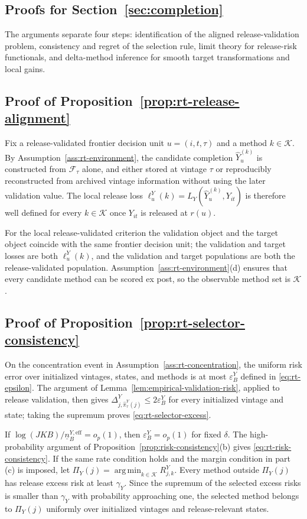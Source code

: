 \documentclass[a4paper, 12pt]{article}
\theoremstyle{plain}
\theoremstyle{remark}
\DeclareMathOperator*{\argmin}{arg\,min}
\newcommand{\Kcal}{\mathcal{K}}
\newcommand{\Fcal}{\mathcal{F}}
\newcommand{\1}{\mathbf{1}}
\begin{document}
\subsection{Proofs for Section~\ref{sec:completion}}

The arguments separate four steps: identification of the aligned release-validation problem, consistency and regret of the selection rule, limit theory for release-risk functionals, and delta-method inference for smooth target transformations and local gains.

\subsection*{Proof of Proposition~\ref{prop:rt-release-alignment}}
Fix a release-validated frontier decision unit \(u=(i,t,\tau)\) and a method \(k\in\Kcal\). By Assumption~\ref{ass:rt-environment}, the candidate completion \(\widehat Y^{(k)}_u\) is constructed from \(\Fcal_\tau\) alone, and either stored at vintage \(\tau\) or reproducibly reconstructed from archived vintage information without using the later validation value. The local release loss \(\ell^Y_u(k)=L_Y(\widehat Y^{(k)}_u,Y_{it})\) is therefore well defined for every \(k\in\Kcal\) once \(Y_{it}\) is released at \(r(u)\).

For the local release-validated criterion the validation object and the target object coincide with the same frontier decision unit; the validation and target losses are both \(\ell^Y_u(k)\), and the validation and target populations are both the release-validated population. Assumption~\ref{ass:rt-environment}(d) ensures that every candidate method can be scored ex post, so the observable method set is \(\Kcal\).

\subsection*{Proof of Proposition~\ref{prop:rt-selector-consistency}}
On the concentration event in Assumption~\ref{ass:rt-concentration}, the uniform risk error over initialized vintages, states, and methods is at most \(\varepsilon^Y_B\) defined in \eqref{eq:rt-epsilon}. The argument of Lemma~\ref{lem:empirical-validation-risk}, applied to release validation, then gives \(\Delta^Y_{j,\widehat\pi^Y_\tau(j)}\leq 2\varepsilon^Y_B\) for every initialized vintage and state; taking the supremum proves \eqref{eq:rt-selector-excess}.

If \(\log(JKB)/\underline n^{Y,\mathrm{eff}}_B=o_p(1)\), then \(\varepsilon^Y_B=o_p(1)\) for fixed \(\delta\). The high-probability argument of Proposition~\ref{prop:risk-consistency}(b) gives \eqref{eq:rt-risk-consistency}. If the same rate condition holds and the margin condition in part (c) is imposed, let \(\Pi_Y(j)=\argmin_{k\in\Kcal}R^Y_{j,k}\). Every method outside \(\Pi_Y(j)\) has release excess risk at least \(\gamma_Y\). Since the supremum of the selected excess risks is smaller than \(\gamma_Y\) with probability approaching one, the selected method belongs to \(\Pi_Y(j)\) uniformly over initialized vintages and release-relevant states.
\end{document}
